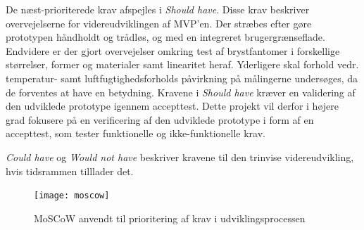 De næst-prioriterede krav afspejles i \textit{Should have}. Disse krav beskriver overvejelserne for videreudviklingen af MVP'en. Der stræbes efter gøre prototypen håndholdt og trådløs, og med en integreret  brugergrænseflade. Endvidere er der gjort overvejelser omkring test af brystfantomer i forskellige størrelser, former og materialer samt linearitet heraf. Yderligere skal forhold vedr. temperatur- samt luftfugtighedsforholds påvirkning på målingerne undersøges, da de forventes at have en  betydning. 
Kravene i \textit{Should have} kræver en validering af den udviklede prototype igennem accepttest. Dette projekt vil derfor i højere grad fokusere på en verificering af den udviklede prototype i form af en accepttest, som tester funktionelle og ikke-funktionelle krav. 

\textit{Could have} og \textit{Would not have} beskriver kravene til den trinvise videreudvikling, hvis tidsrammen tilllader det. 

\begin{figure}[]
\texttt{[image: moscow]}
\caption{MoSCoW anvendt til prioritering af krav i udviklingsprocessen}
\label{fig:moscow}
\end{figure}


